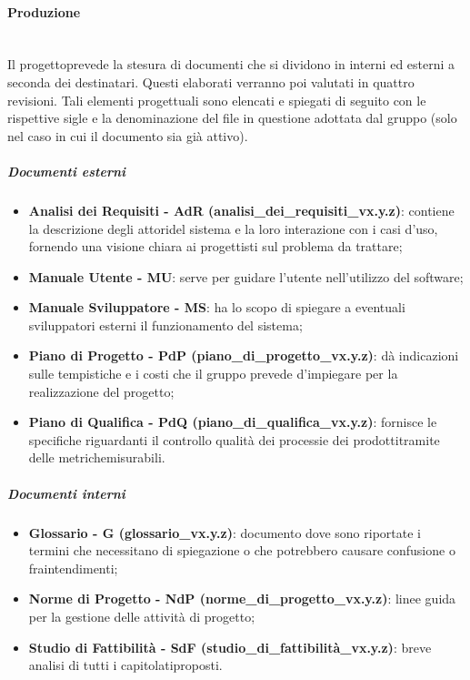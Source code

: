             \paragraph{Produzione}\mbox{}\\ [1mm]
                    Il progetto\glosp prevede la stesura di documenti che si dividono in interni ed esterni a seconda dei destinatari. Questi elaborati verranno poi valutati in quattro revisioni. Tali elementi progettuali sono elencati e spiegati di seguito con le rispettive sigle e la denominazione del file in questione adottata dal gruppo (solo nel caso in cui il documento sia già attivo).
                \subparagraph{Documenti esterni}
                    \begin{itemize}
                        \item \textbf{Analisi dei Requisiti - AdR (analisi\_dei\_requisiti\_vx.y.z)}: contiene la descrizione degli attori\glosp del sistema e la loro interazione con i casi d'uso\glo, fornendo una visione chiara ai progettisti sul problema da trattare;
                        \item \textbf{Manuale Utente - MU}: serve per guidare l'utente nell'utilizzo del software;
                        \item \textbf{Manuale Sviluppatore - MS}: ha lo scopo di spiegare a eventuali sviluppatori esterni il funzionamento
                                                                  del sistema;
                        \item \textbf{Piano di Progetto - PdP (piano\_di\_progetto\_vx.y.z)}: dà indicazioni sulle tempistiche e i costi che il gruppo prevede d'impiegare
                                                                                           per la realizzazione del progetto\glo;
                        \item \textbf{Piano di Qualifica - PdQ (piano\_di\_qualifica\_vx.y.z)}: fornisce le specifiche riguardanti il controllo qualità dei processi\glosp e dei prodotti\glosp tramite delle metriche\glosp misurabili.
                    \end{itemize}
                \subparagraph{Documenti interni}
                    \begin{itemize}
                        \item \textbf{Glossario - G (glossario\_vx.y.z)}: documento dove sono riportate i termini che necessitano di spiegazione o che potrebbero causare confusione o fraintendimenti;
                        \item \textbf{Norme di Progetto - NdP (norme\_di\_progetto\_vx.y.z)}: linee guida per la gestione delle attività di progetto\glo;
                        \item \textbf{Studio di Fattibilità - SdF (studio\_di\_fattibilità\_vx.y.z)}: breve analisi di tutti i capitolati\glosp proposti.
                    \end{itemize}
